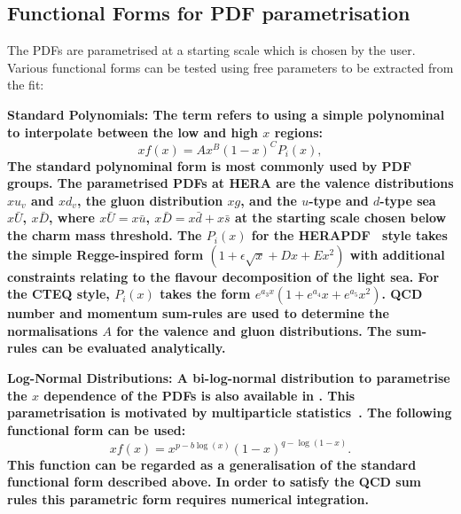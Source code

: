\subsection{Functional Forms for PDF parametrisation}
The PDFs are parametrised at a starting scale which is chosen by the user. Various functional forms can be tested using free parameters to be extracted from the fit:
\begin{description}
\item \bf {Standard Polynomials:} \rm
The term refers to using a simple polynominal to interpolate between the low and high $x$ regions:
\begin{equation}
 xf(x) = A x^{B} (1-x)^{C} P_i(x),
\label{eqn:pdf_std}
\end{equation}
The standard polynominal form is most commonly used by PDF groups.
The parametrised PDFs at HERA are the valence distributions
$xu_v$ and $xd_v$, the gluon distribution $xg$, and the $u$-type and $d$-type sea 
$x\bar{U}$, $x\bar{D}$, where $x\bar{U} = x\bar{u}$, 
$x\bar{D} = x\bar{d} +x\bar{s}$ at the starting scale chosen below the charm mass threshold. 
The $P_i(x)$ for the HERAPDF~\cite{h1zeus:2009wt} style takes the simple Regge-inspired form  
$(1 + \epsilon \sqrt{x} + D x + E x^2)$
with additional constraints relating to the flavour decomposition of the 
light sea. 
For the CTEQ style, $P_i(x)$ takes the form $e^{a_3x} (1 + e^{a_4} x + e^{a_5} x^2)$.
QCD number and momentum sum-rules are used to determine the normalisations $A$ for the valence and gluon distributions. 
The sum-rules can be evaluated analytically.

\item \bf {Log-Normal Distributions:} \rm
A bi-log-normal distribution to parametrise the $x$ dependence of the PDFs is 
also available in \fitter.
This parametrisation is motivated by  multiparticle statistics~\cite{hera-lhc:report2009}. 
The following functional form can be used:
\begin{equation}
 xf(x)=x^{p-b\log(x)}(1-x)^{q-\log(1-x)}.
\end{equation}
This function can be regarded as a generalisation of the standard functional form described above. 
In order to satisfy the QCD sum rules this parametric form requires numerical integration.


\end{description}
